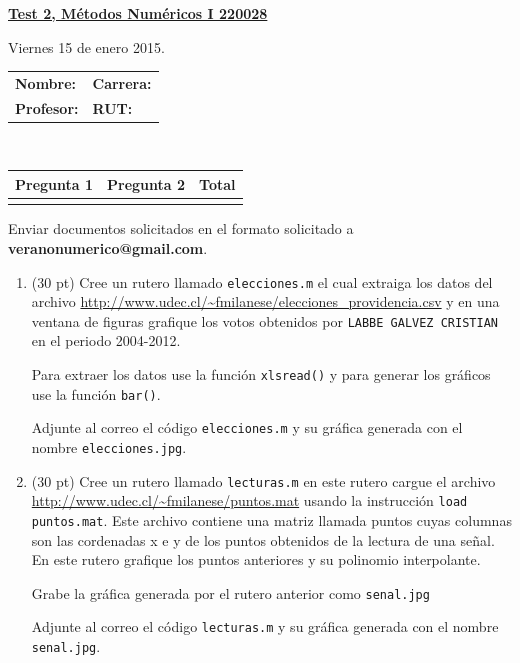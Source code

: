 \documentclass[11pt]{article}
\begin{document}
\hspace*{-1,5cm}

\vspace*{0.5cm} \centerline {\bf\underline{Test 2, M\'etodos Num\'ericos I 220028 }}
\centerline{\textrm{Viernes 15 de enero 2015.}}  \vspace{0.2cm}


\begin{center}
 \begin{tabular}{p{}p{}}
	\textbf{Nombre:}   &\textbf{Carrera:}\\
	\textbf{Profesor:} & \textbf{ RUT:}
 \end{tabular}
 \\
 \vspace{0.2cm}
 \begin{tabular}{||p{2cm}|p{2cm}||p{2cm}||}
 \hline
 Pregunta 1 &  Pregunta 2  &     Total\\
 \hline

  \vspace{1.5cm} & &     \\
 \hline
 \end{tabular}
 \end{center}
 Enviar documentos solicitados en el formato solicitado a \textbf{veranonumerico@gmail.com}.

\begin{enumerate}
\item (30 pt) Cree un rutero llamado \texttt{elecciones.m} el cual extraiga los datos del archivo \url{http://www.udec.cl/~fmilanese/elecciones_providencia.csv} y en una ventana de figuras grafique los votos obtenidos por \texttt{LABBE GALVEZ CRISTIAN} en el periodo 2004-2012.

Para extraer los datos use la funci\'on \texttt{xlsread()} y para generar los gráficos use la funci\'on \texttt{bar()}.

Adjunte al correo el c\'odigo \texttt{elecciones.m} y su gr\'afica generada con el nombre \texttt{elecciones.jpg}.



\item (30 pt) Cree un rutero llamado \texttt{lecturas.m} en este rutero cargue el archivo \url{http://www.udec.cl/~fmilanese/puntos.mat} usando la instrucci\'on \texttt{load puntos.mat}. Este archivo contiene una matriz llamada puntos cuyas columnas son las cordenadas x e y de los puntos obtenidos de la lectura de una se\~{n}al. En este rutero grafique los puntos anteriores y su polinomio interpolante.

Grabe la gr\'afica generada por el rutero anterior como \texttt{senal.jpg}

Adjunte al correo el c\'odigo \texttt{lecturas.m} y su gr\'afica generada con el nombre \texttt{senal.jpg}.

\end{enumerate}
\end{document}
